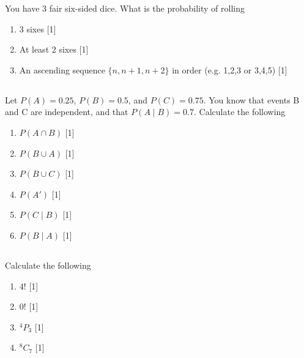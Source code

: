 \documentclass[twocolumn]{article}
\newcounter{pmarks}
\newcounter{marks}
\newcommand\mrk[1]{{\hfill\color{blue}\small[{#1}]}\addtocounter{pmarks}{#1}\addtocounter{marks}{#1}}
\begin{document}
    You have 3 fair six-sided dice. What is the probability of rolling

    \begin{multicols}{2}
        \begin{enumerate}
            \item 3 sixes \mrk{1}
            \item At least 2 sixes \mrk{1}
        \end{enumerate}
    \end{multicols}
    \begin{enumerate}
        \setcounter{enumi}{2}
        \item An ascending sequence $\{ n, n+1, n+2 \}$ in order (e.g. 1,2,3 or 3,4,5) \mrk{1}
    \end{enumerate}


\subsection{}

    Let $P(A) = 0.25$, $P(B) = 0.5$, and $P(C) = 0.75$. You know that events B and C are independent, and that $P(A \mid B ) = 0.7 $. Calculate the following
    
    \begin{multicols}{2}
        \begin{enumerate}
            \item $P(A \cap B)$ \mrk{1}
            \item $P(B \cup A)$ \mrk{1}
            \item $P(B \cup C)$ \mrk{1}
            \item $P(A')$ \mrk{1}
            \item $P(C \mid B)$ \mrk{1}
            \item $P(B \mid A)$ \mrk{1}
        \end{enumerate}
    \end{multicols}

\subsection{}

    Calculate the following

    \begin{multicols}{2}
        \begin{enumerate}
            \item $ 4! $ \mrk{1}
            \item $ 0! $ \mrk{1}
            \item $ ^4P_3 $ \mrk{1}
            \item $ ^{8}C_{7} $ \mrk{1}
        \end{enumerate}
    \end{multicols}
\end{document}
